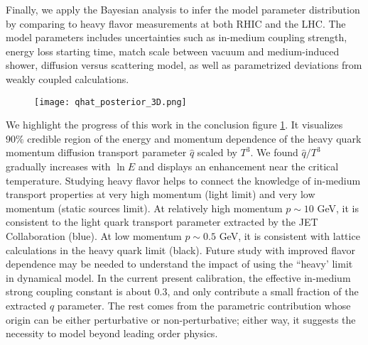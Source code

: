 Finally, we apply the Bayesian analysis to infer the model parameter distribution by comparing to heavy flavor measurements at both RHIC and the LHC.
The model parameters includes uncertainties such as in-medium coupling strength, energy loss starting time, match scale between vacuum and medium-induced shower, diffusion versus scattering model, as well as parametrized deviations from weakly coupled calculations.

\begin{figure}
\centering
\texttt{[image: qhat\_posterior\_3D.png]}
\caption{}
\label{fig:conlusion}
\end{figure}

We highlight the progress of this work in the conclusion figure \ref{fig:conlusion}.
It visualizes $90\%$ credible region of the energy and momentum dependence of the heavy quark momentum diffusion transport parameter $\hat{q}$ scaled by $T^3$.
We found $\hat{q}/T^3$ gradually increases with $\ln E$ and displays an enhancement near the critical temperature.
Studying heavy flavor helps to connect the knowledge of in-medium transport properties at very high momentum (light limit) and very low momentum (static sources limit).
At relatively high momentum $p\sim 10$ GeV, it is consistent to the light quark transport parameter extracted by the JET Collaboration (blue).
At low momentum $p\sim 0.5$ GeV, it is consistent with lattice calculations in the heavy quark limit (black).
Future study with improved flavor dependence may be needed to understand the impact of using the ``heavy' limit in dynamical model.
In the current present calibration, the effective in-medium strong coupling constant is about $0.3$, and only contribute a small fraction of the extracted $\hat{q}$ parameter.
The rest comes from the parametric contribution whose origin can be either perturbative or non-perturbative; either way, it suggests the necessity to model beyond leading order physics.

